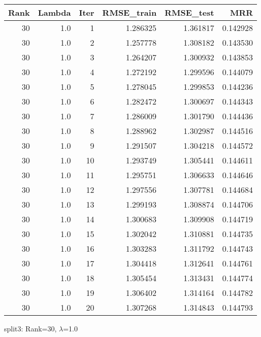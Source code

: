 \begin{tabular}{rrrrrr}
\toprule
 Rank &  Lambda &  Iter &  RMSE\_train &  RMSE\_test &       MRR \\
\midrule
   30 &     1.0 &     1 &    1.286325 &   1.361817 &  0.142928 \\
   30 &     1.0 &     2 &    1.257778 &   1.308182 &  0.143530 \\
   30 &     1.0 &     3 &    1.264207 &   1.300932 &  0.143853 \\
   30 &     1.0 &     4 &    1.272192 &   1.299596 &  0.144079 \\
   30 &     1.0 &     5 &    1.278045 &   1.299853 &  0.144236 \\
   30 &     1.0 &     6 &    1.282472 &   1.300697 &  0.144343 \\
   30 &     1.0 &     7 &    1.286009 &   1.301790 &  0.144436 \\
   30 &     1.0 &     8 &    1.288962 &   1.302987 &  0.144516 \\
   30 &     1.0 &     9 &    1.291507 &   1.304218 &  0.144572 \\
   30 &     1.0 &    10 &    1.293749 &   1.305441 &  0.144611 \\
   30 &     1.0 &    11 &    1.295751 &   1.306633 &  0.144646 \\
   30 &     1.0 &    12 &    1.297556 &   1.307781 &  0.144684 \\
   30 &     1.0 &    13 &    1.299193 &   1.308874 &  0.144706 \\
   30 &     1.0 &    14 &    1.300683 &   1.309908 &  0.144719 \\
   30 &     1.0 &    15 &    1.302042 &   1.310881 &  0.144735 \\
   30 &     1.0 &    16 &    1.303283 &   1.311792 &  0.144743 \\
   30 &     1.0 &    17 &    1.304418 &   1.312641 &  0.144761 \\
   30 &     1.0 &    18 &    1.305454 &   1.313431 &  0.144774 \\
   30 &     1.0 &    19 &    1.306402 &   1.314164 &  0.144782 \\
   30 &     1.0 &    20 &    1.307268 &   1.314843 &  0.144793 \\
\bottomrule
\end{tabular}

\caption{split3: Rank=30, $\lambda$=1.0}
